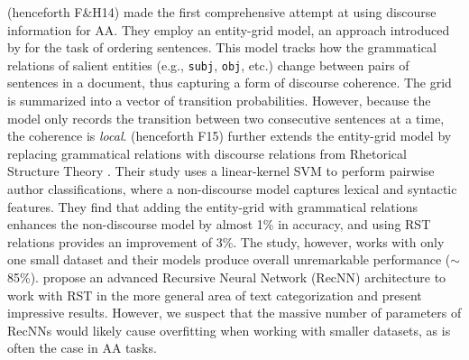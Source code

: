 \citet{Feng:2014} (henceforth F\&H14) made the first comprehensive attempt at using discourse information for AA. They employ an entity-grid model, an approach introduced by \citet{Barzilay:2008} for the task of ordering sentences. This model tracks how the grammatical relations of salient entities (e.g., \texttt{subj}, \texttt{obj}, etc.) change between pairs of sentences in a document, thus capturing a form of discourse coherence. The grid is summarized into a vector of transition probabilities. However, because the model only records the transition between two consecutive sentences at a time, the coherence is \textit{local}. \citet{Feng:2015} (henceforth F15) further extends the entity-grid model by replacing grammatical relations with discourse relations from Rhetorical Structure Theory \citep[RST]{Mann:1988}. Their study uses a linear-kernel SVM to perform pairwise author classifications, where a non-discourse model captures lexical and syntactic features. They find that adding the entity-grid with grammatical relations enhances the non-discourse model by almost 1\% in accuracy, and using RST relations provides an improvement of 3\%. The study, however, works with only one small dataset and their models produce overall unremarkable performance ($\sim$85\%). 
\citet{Ji:2017} propose an advanced Recursive Neural Network (RecNN) architecture to work with RST in the more general area of text categorization and present impressive results.
However, we suspect that the massive number of parameters of RecNNs would likely cause overfitting when working with smaller datasets, as is often the case in AA tasks. 

